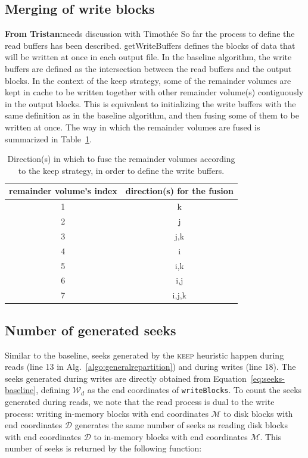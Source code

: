 \documentclass[sigconf, nonacm]{acmart}
\newcommand{\tristan}[1]{\color{orange}\textbf{From Tristan:}#1\color{black}}
\newcommand{\keep}[0]{\textsc{keep}\xspace}
\begin{document}
\subsection{Merging of write blocks}
\tristan{needs discussion with Timothée}
So far the process to define the read buffers has been described.
getWriteBuffers defines the blocks of data that will be written at once in each
output file.
In the baseline algorithm, the write buffers are defined as the
intersection between the read buffers and the output blocks.
In the context of the keep strategy, some of the remainder volumes are kept in cache
to be written together with other remainder volume(s) contiguously in the output
blocks.
This is equivalent to initializing the write buffers with the same definition as
in the baseline algorithm, and then fusing some of them to be written at once.
The way in which the remainder volumes are fused is summarized in
Table~\ref{tab:fusion}.

\begin{table}[ht]
  \centering
  \caption{Direction(s) in which to fuse the remainder volumes according to the keep strategy, in order to define the write buffers.}

   \begin{tabular}[t]{ | c | c | }
   \hline
   remainder volume's index & direction(s) for the fusion \\
     \hline\hline
     1 & k \\
     \hline
     2 & j \\
     \hline
     3 & j,k \\
     \hline
     4 & i \\
     \hline
     5 & i,k \\
     \hline
     6 & i,j \\
     \hline
     7 & i,j,k \\
     \hline
   \end{tabular}

   \label{tab:fusion}

\end{table}

\subsection{Number of generated seeks}

Similar to the
baseline, seeks generated by the \keep heuristic happen during reads (line
13 in Alg.~\ref{algo:generalrepartition}) and during writes (line 18). The
seeks generated during writes are directly obtained from
Equation~\ref{eq:seeks-baseline}, defining $\mathcal{W}_d$ as the end coordinates of
\texttt{writeBlocks}. To count the seeks generated
during reads, we note that the read process is dual to the write process:
writing in-memory blocks with end coordinates $\mathcal{M}$ to disk blocks
with end coordinates $\mathcal{D}$ generates the same number of seeks as
reading disk blocks with end coordinates $\mathcal{D}$ to in-memory blocks
with end coordinates $\mathcal{M}$. This number of seeks is returned by the following function:
\end{document}
